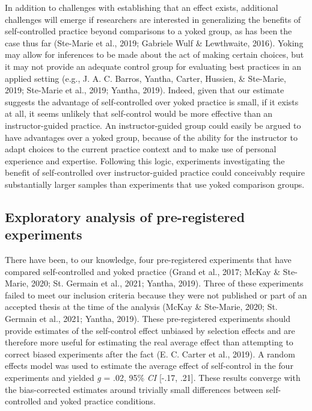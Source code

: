 \documentclass[
  english,
  man, donotrepeattitle,floatsintext]{apa7}
\begin{document}
In addition to challenges with establishing that an effect exists, additional challenges will emerge if researchers are interested in generalizing the benefits of self-controlled practice beyond comparisons to a yoked group, as has been the case thus far (Ste-Marie et al., 2019; Gabriele Wulf \& Lewthwaite, 2016). Yoking may allow for inferences to be made about the act of making certain choices, but it may not provide an adequate control group for evaluating best practices in an applied setting (e.g., J. A. C. Barros, Yantha, Carter, Hussien, \& Ste-Marie, 2019; Ste-Marie et al., 2019; Yantha, 2019). Indeed, given that our estimate suggests the advantage of self-controlled over yoked practice is small, if it exists at all, it seems unlikely that self-control would be more effective than an instructor-guided practice. An instructor-guided group could easily be argued to have advantages over a yoked group, because of the ability for the instructor to adapt choices to the current practice context and to make use of personal experience and expertise. Following this logic, experiments investigating the benefit of self-controlled over instructor-guided practice could conceivably require substantially larger samples than experiments that use yoked comparison groups.

\hypertarget{exploratory-analysis-of-pre-registered-experiments}{%
\subsection{Exploratory analysis of pre-registered experiments}\label{exploratory-analysis-of-pre-registered-experiments}}

There have been, to our knowledge, four pre-registered experiments that have compared self-controlled and yoked practice (Grand et al., 2017; McKay \& Ste-Marie, 2020; St. Germain et al., 2021; Yantha, 2019). Three of these experiments failed to meet our inclusion criteria because they were not published or part of an accepted thesis at the time of the analysis (McKay \& Ste-Marie, 2020; St. Germain et al., 2021; Yantha, 2019). These pre-registered experiments should provide estimates of the self-control effect unbiased by selection effects and are therefore more useful for estimating the real average effect than attempting to correct biased experiments after the fact (E. C. Carter et al., 2019). A random effects model was used to estimate the average effect of self-control in the four experiments and yielded \emph{g} = .02, 95\% \emph{CI} {[}-.17, .21{]}. These results converge with the bias-corrected estimates around trivially small differences between self-controlled and yoked practice conditions.
\end{document}

